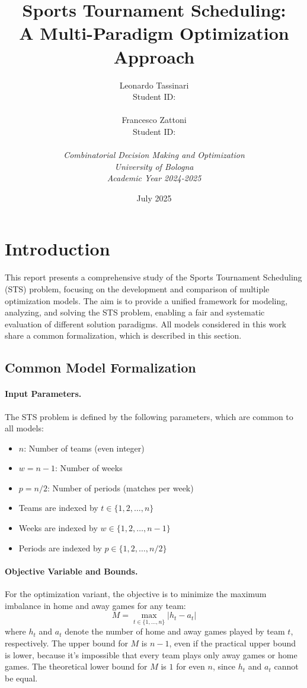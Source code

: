 \documentclass[11pt]{article}
\title{\textbf{Sports Tournament Scheduling: \\
A Multi-Paradigm Optimization Approach}}
\author{
Leonardo Tassinari \\
Student ID:   \\
\\
Francesco Zattoni \\
Student ID:   \\
\\
\textit{Combinatorial Decision Making and Optimization} \\
\textit{University of Bologna} \\
\textit{Academic Year 2024-2025}
}
\date{July 2025}
\begin{document}
\maketitle

\tableofcontents
\newpage

\section{Introduction}

This report presents a comprehensive study of the Sports Tournament Scheduling (STS) problem, focusing on the development and comparison of multiple optimization models. The aim is to provide a unified framework for modeling, analyzing, and solving the STS problem, enabling a fair and systematic evaluation of different solution paradigms. All models considered in this work share a common formalization, which is described in this section.

\subsection{Common Model Formalization}

\paragraph{Input Parameters.}
The STS problem is defined by the following parameters, which are common to all models:
\begin{itemize}
    \item $n$: Number of teams (even integer)
    \item $w = n-1$: Number of weeks
    \item $p = n/2$: Number of periods (matches per week)
    \item Teams are indexed by $t \in \{1, 2, \ldots, n\}$
    \item Weeks are indexed by $w \in \{1, 2, \ldots, n-1\}$
    \item Periods are indexed by $p \in \{1, 2, \ldots, n/2\}$
\end{itemize}

\paragraph{Objective Variable and Bounds.}
For the optimization variant, the objective is to minimize the maximum imbalance in home and away games for any team:
\[
M = \max_{t \in \{1, \ldots, n\}} |h_t - a_t|
\]
where $h_t$ and $a_t$ denote the number of home and away games played by team $t$, respectively. The upper bound for $M$ is $n-1$, even if the practical upper bound is lower, because it's impossible that every team plays only away games or home games. The theoretical lower bound for $M$ is $1$ for even $n$, since $h_t$ and $a_t$ cannot be equal.
\end{document}
